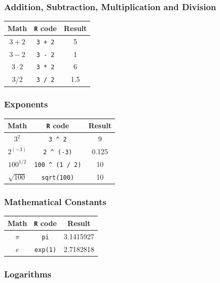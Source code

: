 \documentclass[]{book}
\begin{document}
\hypertarget{addition-subtraction-multiplication-and-division}{%
\subsubsection*{Addition, Subtraction, Multiplication and Division}\label{addition-subtraction-multiplication-and-division}}

\begin{longtable}[]{@{}ccc@{}}
\toprule
Math & \texttt{R} code & Result\tabularnewline
\midrule
\endhead
\(3 + 2\) & \texttt{3\ +\ 2} & 5\tabularnewline
\(3 - 2\) & \texttt{3\ -\ 2} & 1\tabularnewline
\(3 \cdot2\) & \texttt{3\ *\ 2} & 6\tabularnewline
\(3 / 2\) & \texttt{3\ /\ 2} & 1.5\tabularnewline
\bottomrule
\end{longtable}

\hypertarget{exponents}{%
\subsubsection*{Exponents}\label{exponents}}

\begin{longtable}[]{@{}ccc@{}}
\toprule
Math & \texttt{R} code & Result\tabularnewline
\midrule
\endhead
\(3^2\) & \texttt{3\ \^{}\ 2} & 9\tabularnewline
\(2^{(-3)}\) & \texttt{2\ \^{}\ (-3)} & 0.125\tabularnewline
\(100^{1/2}\) & \texttt{100\ \^{}\ (1\ /\ 2)} & 10\tabularnewline
\(\sqrt{100}\) & \texttt{sqrt(100)} & 10\tabularnewline
\bottomrule
\end{longtable}

\hypertarget{mathematical-constants}{%
\subsubsection*{Mathematical Constants}\label{mathematical-constants}}

\begin{longtable}[]{@{}ccc@{}}
\toprule
Math & \texttt{R} code & Result\tabularnewline
\midrule
\endhead
\(\pi\) & \texttt{pi} & 3.1415927\tabularnewline
\(e\) & \texttt{exp(1)} & 2.7182818\tabularnewline
\bottomrule
\end{longtable}

\hypertarget{logarithms}{%
\subsubsection*{Logarithms}\label{logarithms}}
\end{document}
